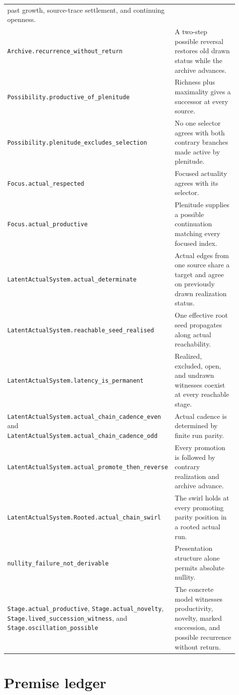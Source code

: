 \documentclass[11pt]{article}
\theoremstyle{definition}
\theoremstyle{remark}
\newcommand{\lean}[1]{\nolinkurl{#1}}
\begin{document}
\begin{longtable}{@{}>{\raggedright\arraybackslash}p{0.33\linewidth}
  >{\raggedright\arraybackslash}p{0.61\linewidth}@{}}
    past growth, source-trace settlement, and continuing openness. \\
\lean{Archive.recurrence_without_return}
  & A two-step possible reversal restores old drawn status while the archive
    advances. \\
\lean{Possibility.productive_of_plenitude}
  & Richness plus maximality gives a successor at every source. \\
\lean{Possibility.plenitude_excludes_selection}
  & No one selector agrees with both contrary branches made active by
    plenitude. \\
\lean{Focus.actual_respected}
  & Focused actuality agrees with its selector. \\
\lean{Focus.actual_productive}
  & Plenitude supplies a possible continuation matching every focused index. \\
\lean{LatentActualSystem.actual_determinate}
  & Actual edges from one source share a target and agree on previously drawn
    realization status. \\
\lean{LatentActualSystem.reachable_seed_realised}
  & One effective root seed propagates along actual reachability. \\
\lean{LatentActualSystem.latency_is_permanent}
  & Realized, excluded, open, and undrawn witnesses coexist at every reachable
    stage. \\
\lean{LatentActualSystem.actual_chain_cadence_even} and
\lean{LatentActualSystem.actual_chain_cadence_odd}
  & Actual cadence is determined by finite run parity. \\
\lean{LatentActualSystem.actual_promote_then_reverse}
  & Every promotion is followed by contrary realization and archive advance. \\
\lean{LatentActualSystem.Rooted.actual_chain_swirl}
  & The swirl holds at every promoting parity position in a rooted actual run. \\
\lean{nullity_failure_not_derivable}
  & Presentation structure alone permits absolute nullity. \\
\lean{Stage.actual_productive}, \lean{Stage.actual_novelty},
\lean{Stage.lived_succession_witness}, and
\lean{Stage.oscillation_possible}
  & The concrete model witnesses productivity, novelty, marked succession, and
    possible recurrence without return. \\
\bottomrule
\end{longtable}
\normalsize

\section{Premise ledger}
\end{document}
